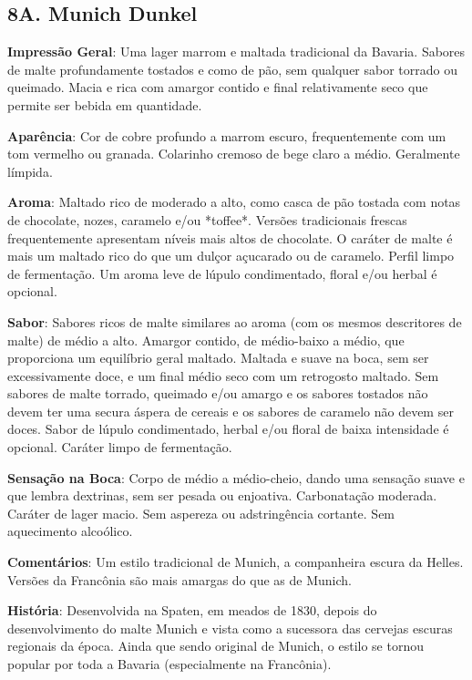 \subsection*{8A. Munich Dunkel}

\textbf{Impressão Geral}: Uma lager marrom e maltada tradicional da Bavaria. Sabores de malte profundamente tostados e como de pão, sem qualquer sabor torrado ou queimado. Macia e rica com amargor contido e final relativamente seco que permite ser bebida em quantidade.

\textbf{Aparência}: Cor de cobre profundo a marrom escuro, frequentemente com um tom vermelho ou granada. Colarinho cremoso de bege claro a médio. Geralmente límpida.

\textbf{Aroma}: Maltado rico de moderado a alto, como casca de pão tostada com notas de chocolate, nozes, caramelo e/ou *toffee*. Versões tradicionais frescas frequentemente apresentam níveis mais altos de chocolate. O caráter de malte é mais um maltado rico do que um dulçor açucarado ou de caramelo. Perfil limpo de fermentação. Um aroma leve de lúpulo condimentado, floral e/ou herbal é opcional.

\textbf{Sabor}: Sabores ricos de malte similares ao aroma (com os mesmos descritores de malte) de médio a alto. Amargor contido, de médio-baixo a médio, que proporciona um equilíbrio geral maltado. Maltada e suave na boca, sem ser excessivamente doce, e um final médio seco com um retrogosto maltado. Sem sabores de malte torrado, queimado e/ou amargo e os sabores tostados não devem ter uma secura áspera de cereais e os sabores de caramelo não devem ser doces. Sabor de lúpulo condimentado, herbal e/ou floral de baixa intensidade é opcional. Caráter limpo de fermentação.

\textbf{Sensação na Boca}: Corpo de médio a médio-cheio, dando uma sensação suave e que lembra dextrinas, sem ser pesada ou enjoativa. Carbonatação moderada. Caráter de lager macio. Sem aspereza ou adstringência cortante. Sem aquecimento alcoólico.

\textbf{Comentários}: Um estilo tradicional de Munich, a companheira escura da Helles. Versões da Francônia são mais amargas do que as de Munich.

\textbf{História}: Desenvolvida na Spaten, em meados de 1830, depois do desenvolvimento do malte Munich e vista como a sucessora das cervejas escuras regionais da época. Ainda que sendo original de Munich, o estilo se tornou popular por toda a Bavaria (especialmente na Francônia).

